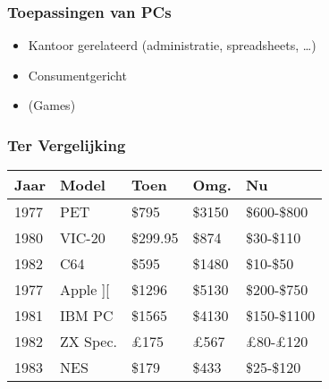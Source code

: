 \documentclass[aspectratio=43]{uva-inf-presentation}
\begin{document}
\begin{frame}
\frametitle{Toepassingen van PCs}

\begin{itemize}
\item Kantoor gerelateerd (administratie, spreadsheets, \dots)
\item Consumentgericht
\item (Games)
\end{itemize}

\end{frame}


\begin{frame}
\frametitle{Ter Vergelijking}

\begin{tabular}{|l|l|l|l|l|}
\hline Jaar & Model & Toen & Omg. & Nu \\ \hline
1977 & PET & \$795 & \$3150 & \$600-\$800 \\
1980 & VIC-20 & \$299.95 & \$874 & \$30-\$110 \\
1982 & C64 & \$595 & \$1480 & \$10-\$50 \\ \hline
1977 & Apple ][ & \$1296 & \$5130 & \$200-\$750 \\
1981 & IBM PC & \$1565 & \$4130 & \$150-\$1100 \\
1982 & ZX Spec. & \pounds 175 & \pounds 567 & \pounds 80-\pounds 120 \\ \hline
1983 & NES & \$179 & \$433 & \$25-\$120 \\ \hline
\end{tabular}


\end{frame}
\end{document}
